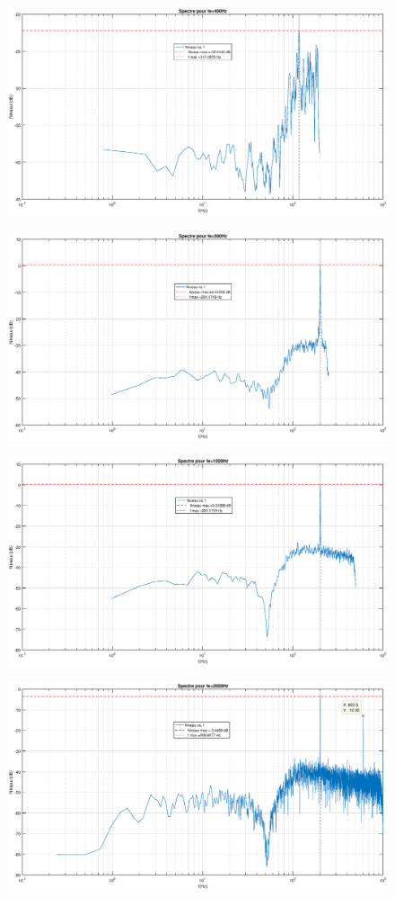 \documentclass[12pt,a4paper]{article}
\begin{document}
\begin{figure}
	\centering
	\includegraphics[width=0.7\linewidth]{"res/echantillonnage 400Hz"}
	\caption{}
	\label{fig:echantillonnage-400hz}
\end{figure}
\begin{figure}
	\centering
	\includegraphics[width=0.7\linewidth]{"res/echantillonnage 500Hz"}
	\caption{}
	\label{fig:echantillonnage-500hz}
\end{figure}
\begin{figure}
	\centering
	\includegraphics[width=0.7\linewidth]{"res/echantillonnage 1000Hz"}
	\caption{}
	\label{fig:echantillonnage-1000hz}
\end{figure}
\begin{figure}
	\centering
	\includegraphics[width=0.7\linewidth]{"res/echantillonnage 2000Hz"}
	\caption{}
	\label{fig:echantillonnage-2000hz}
\end{figure}
\end{document}
